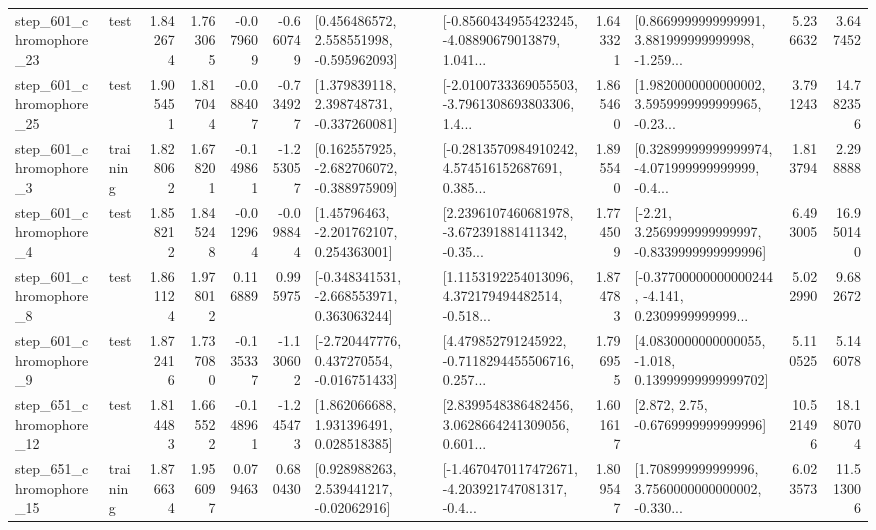 \begin{tabular}{llrrrrllrlrr}
  step\_601\_chromophore\_23 &      test &      1.842674 &    1.763065 &     -0.079609 & -0.660749 &    [0.456486572, 2.558551998, -0.595962093] &  [-0.8560434955423245, -4.08890679013879, 1.041... &       1.643321 &  [0.8669999999999991, 3.881999999999998, -1.259... &            5.236632 &          3.647452 \\
  step\_601\_chromophore\_25 &      test &      1.905451 &    1.817044 &     -0.088407 & -0.734927 &    [1.379839118, 2.398748731, -0.337260081] &  [-2.0100733369055503, -3.7961308693803306, 1.4... &       1.865460 &  [1.9820000000000002, 3.5959999999999965, -0.23... &            3.791243 &         14.782356 \\
   step\_601\_chromophore\_3 &  training &      1.828062 &    1.678201 &     -0.149861 & -1.253057 &   [0.162557925, -2.682706072, -0.388975909] &  [-0.2813570984910242, 4.574516152687691, 0.385... &       1.895540 &  [0.32899999999999974, -4.071999999999999, -0.4... &            1.813794 &          2.298888 \\
   step\_601\_chromophore\_4 &      test &      1.858212 &    1.845248 &     -0.012964 & -0.098844 &     [1.45796463, -2.201762107, 0.254363001] &  [2.2396107460681978, -3.672391881411342, -0.35... &       1.774509 &   [-2.21, 3.2569999999999997, -0.8339999999999996] &            6.493005 &         16.950140 \\
   step\_601\_chromophore\_8 &      test &      1.861124 &    1.978012 &      0.116889 &  0.995975 &   [-0.348341531, -2.668553971, 0.363063244] &  [1.1153192254013096, 4.372179494482514, -0.518... &       1.874783 &  [-0.37700000000000244, -4.141, 0.2309999999999... &            5.022990 &          9.682672 \\
   step\_601\_chromophore\_9 &      test &      1.872416 &    1.737080 &     -0.135337 & -1.130602 &   [-2.720447776, 0.437270554, -0.016751433] &  [4.479852791245922, -0.7118294455506716, 0.257... &       1.796955 &  [4.0830000000000055, -1.018, 0.13999999999999702] &            5.110525 &          5.146078 \\
  step\_651\_chromophore\_12 &      test &      1.814483 &    1.665522 &     -0.148961 & -1.245473 &     [1.862066688, 1.931396491, 0.028518385] &  [2.8399548386482456, 3.0628664241309056, 0.601... &       1.601617 &                 [2.872, 2.75, -0.6769999999999996] &           10.521496 &         18.180704 \\
  step\_651\_chromophore\_15 &  training &      1.876634 &    1.956097 &      0.079463 &  0.680430 &     [0.928988263, 2.539441217, -0.02062916] &  [-1.4670470117472671, -4.203921747081317, -0.4... &       1.809547 &  [1.708999999999996, 3.7560000000000002, -0.330... &            6.023573 &         11.513006 \\

\end{tabular}
